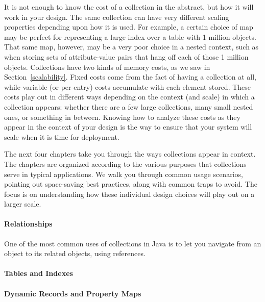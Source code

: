 It is not enough to know the cost
of a collection in the abstract, but how it will work in your design. The same collection can
have very different scaling properties depending upon how it is used. For
example, a certain choice of map may be perfect for representing a large index over a table with 1 million objects. 
That same map, however, may be a very poor
choice in a nested context, such as when storing sets of attribute-value 
pairs that hang off each of those 1 million objects.
Collections have two kinds of memory costs, as we saw in
Section~\ref{scalability}. Fixed costs come from the fact of having a
collection at all, while variable (or per-entry) costs accumulate with each element stored. These costs play out in different ways depending on
the context (and scale) in which a collection appears: whether there are a few
large collections, many small nested ones, or something in between.
Knowing how to analyze these costs as they appear in
the context of your design is the way to ensure that your system will scale
when it is time for deployment.

The next four chapters take you through the ways collections appear in context. 
The chapters are organized according to the various purposes that collections
serve in typical applications.  We walk you through common usage
scenarios, pointing out space-saving best
practices, along with common traps to avoid. The focus is on understanding how
these individual design choices will play out on a larger scale.


\paragraph{Relationships}  One of the most common uses of collections in Java is
to let you navigate from an object to its related objects, using references.
\paragraph{Tables and Indexes}
\paragraph{Dynamic Records and Property Maps}
